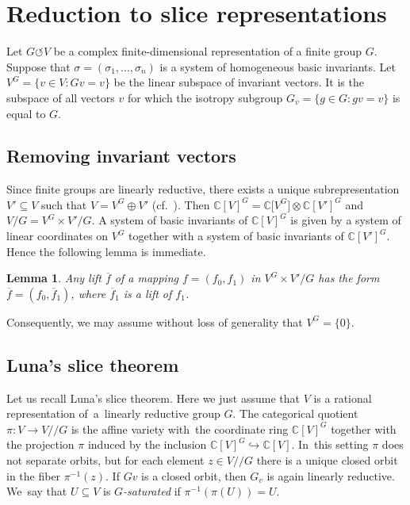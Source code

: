 \documentclass[pdftex]{sigma}
\numberwithin{equation}{section}
\newtheorem{Lemma}[Theorem]{Lemma}
\def\si{\sigma}
\def\C{\mathbb{C}}
\def\cq{{/\!\!/}}
\def\acts{\circlearrowleft}
\begin{document}
\section{Reduction to slice representations}

Let $G \acts V$ be a complex finite-dimensional representation of a finite group $G$.
Suppose that $\si=(\si_1,\dots,\si_n)$ is a system of homogeneous basic invariants.
Let $V^G = \{v \in V \colon Gv=v\}$ be the linear subspace of invariant vectors.
It is the subspace of all vectors $v$ for which the isotropy subgroup $G_v = \{g \in G \colon gv = v\}$ is
equal to $G$.

\subsection{Removing invariant vectors} %

Since finite groups are linearly reductive,
there exists a unique subrepresentation $V' \subseteq V$ such that $V = V^G \oplus V'$ (cf.\ \cite[Theorem 2.2.5]{DK02}).
Then
$\C[V]^G = \C\big[V^G\big] \otimes \C[V']^G$ and
$V/ G = V^G \times V' / G$.
A system of basic invariants of $\C[V]^G$ is given by a system of linear coordinates on $V^G$ together with a
system of basic invariants of $\C[V']^G$. Hence the following lemma is immediate.

\begin{Lemma} \label{fix}
Any lift $\overline f$ of a mapping $f=(f_0,f_1)$ in $V^G \times V' / G$ has the form
$\overline f = (f_0,\overline f_1)$,
where $\overline f_1$ is a lift of $f_1$.
\end{Lemma}


Consequently, we may assume without loss of generality that $V^G = \{0\}$.


\subsection{Luna's slice theorem}
Let us recall Luna's slice theorem.
Here we just assume that $V$ is a rational representation of~a~linearly reductive group $G$.
The categorical quotient $\pi \colon V \to V\cq G$ is the affine variety with~the coordinate ring $\C[V]^G$
together with the projection $\pi$ induced by the inclusion \mbox{$\C[V]^G \hookrightarrow \C[V]$}. In~this setting $\pi$ does not separate orbits, but for each element $z \in V \cq G$ there is a unique
closed orbit in the fiber $\pi^{-1}(z)$.
If $Gv$ is a closed orbit, then $G_v$ is again linearly reductive. We~say that $U \subseteq V$ is \emph{$G$-saturated} if $\pi^{-1} (\pi(U)) = U$.
\end{document}
